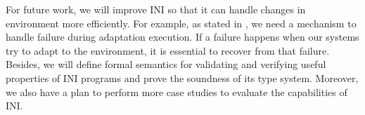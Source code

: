 \documentclass[runningheads,a4paper]{llncs}
\begin{document}
For future work, we will improve INI so that it can handle changes in environment more efficiently. For example, as stated in \cite{Cheng2006}, we need a mechanism to handle failure during adaptation execution. If a failure happens when our systems try to adapt to the environment, it is essential to recover from that failure. Besides, we will define formal semantics for validating and verifying useful properties of INI programs and prove the soundness of its type system. Moreover, we also have a plan to perform more case studies to evaluate the capabilities of INI.


\end{document}
